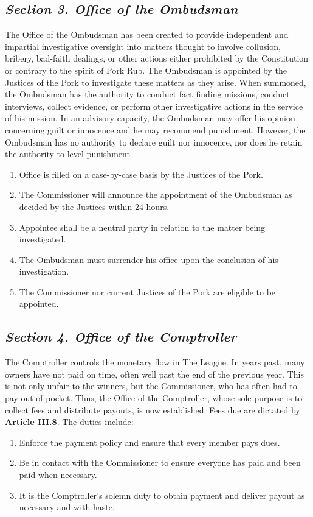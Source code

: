 \documentclass{article}
\begin{document}
    \subsection{\textit{Section 3. Office of the Ombudsman}}
    The Office of the Ombudsman has been created to provide independent and impartial investigative oversight into matters thought to involve collusion, bribery, bad-faith dealings, or other actions either prohibited by the Constitution or contrary to the spirit of Pork Rub. The Ombudsman is appointed by the Justices of the Pork to investigate these matters as they arise. When summoned, the Ombudsman has the authority to conduct fact finding missions, conduct interviews, collect evidence, or perform other investigative actions in the service of his mission. In an advisory capacity, the Ombudsman may offer his opinion concerning guilt or innocence and he may recommend punishment. However, the Ombudsman has no authority to declare guilt nor innocence, nor does he retain the authority to level punishment.
    \begin{enumerate}[label=\Alph*)]
        \item Office is filled on a case-by-case basis by the Justices of the Pork.
        \item The Commissioner will announce the appointment of the Ombudsman as decided by the Justices within 24 hours.
        \item Appointee shall be a neutral party in relation to the matter being investigated.
        \item The Ombudsman must surrender his office upon the conclusion of his investigation.
        \item The Commissioner nor current Justices of the Pork are eligible to be appointed.
    \end{enumerate}
    \subsection{\textit{Section 4. Office of the Comptroller}}
    The Comptroller controls the monetary flow in The League. In years past, many owners have not paid on time, often well past the end of the previous year. This is not only unfair to the winners, but the Commissioner, who has often had to pay out of pocket. Thus, the Office of the Comptroller, whose sole purpose is to collect fees and distribute payouts, is now established. Fees due are dictated by \textbf{Article III.8}. The duties include:
    \begin{enumerate}[label=\Alph*)]
        \item Enforce the payment policy and ensure that every member pays dues.
        \item Be in contact with the Commissioner to ensure everyone has paid and been paid when necessary.
        \item It is the Comptroller’s solemn duty to obtain payment and deliver payout as necessary and with haste.
    \end{enumerate}
\end{document}
